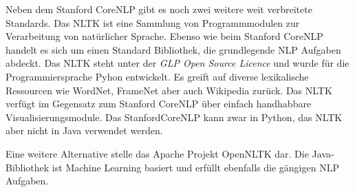Neben dem Stanford CoreNLP gibt es noch zwei weitere weit verbreitete Standards. Das \ac{NLTK} ist eine Sammlung von Programmmodulen zur Verarbeitung von natürlicher Sprache. Ebenso wie beim Stanford CoreNLP handelt es sich um einen Standard Bibliothek, die grundlegende \ac{NLP} Aufgaben abdeckt. Das \ac{NLTK} steht unter der \textit{GLP Open Source Licence} und wurde für die Programmiersprache Pyhon entwickelt. Es greift auf diverse lexikalische Ressourcen wie WordNet, FrameNet aber auch Wikipedia zurück. Das \ac{NLTK} verfügt im Gegensatz zum Stanford CoreNLP über einfach handhabbare Visualisierungsmodule. Das StanfordCoreNLP kann zwar in Python, das NLTK aber nicht in Java verwendet werden.
\par
Eine weitere Alternative stelle das Apache Projekt OpenNLTK dar. Die Java-Bibliothek ist Machine Learning basiert und erfüllt ebenfalls die gängigen NLP Aufgaben.

